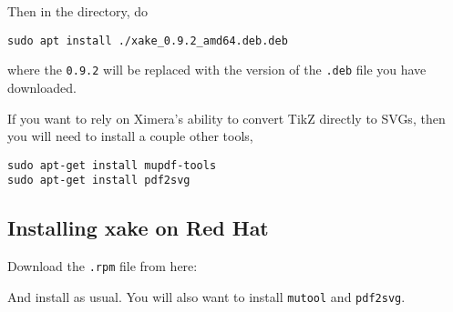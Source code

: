 \documentclass{ximera}
\begin{document}

Then in the directory, do

\begin{verbatim}
sudo apt install ./xake_0.9.2_amd64.deb.deb
\end{verbatim}

where the \verb|0.9.2| will be replaced with the version of the
\verb|.deb| file you have downloaded.

If you want to rely on Ximera's ability to convert TikZ directly to SVGs, then you will need to install a couple other tools,
\begin{verbatim}
sudo apt-get install mupdf-tools
sudo apt-get install pdf2svg
\end{verbatim}

\subsection{Installing xake on Red Hat}

Download the \verb|.rpm| file from here:


And install as usual.  You will also want to install \verb|mutool| and \verb|pdf2svg|.
\end{document}
